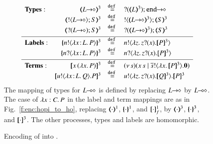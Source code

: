 \begin{figure}[t]
\[
\begin{array}{lrcll}
\noindent{\bf Types:} & 
		\tmap{\shot{L}}{3} &\defeq& \shot{\btinp{\tmap{L}{3}} \tinact}
		\\
&		\tmap{\btout{\shot{L}} S}{3} &\defeq& \btout{\tmap{\shot{L}}{3}} \tmap{S}{3}
		\\
&		\tmap{\btinp{\shot{L}} S}{3} &\defeq& \btinp{\tmap{\shot{L}}{3}} \tmap{S}{3}
\\[1mm]
\hline
\noindent{\bf Labels:} & 
		\mapa{\bactout{n}{\abs{\AT{x}{L}}{P}}}^{3} &\defeq& \bactout{n}{\abs{z}{\binp{z}{x} \pmap{P}{3}}}
		\\
&		\mapa{\bactinp{n}{\abs{\AT{x}{L}}{P}}}^{3} &\defeq& \bactinp{n}{\abs{z}{\binp{z}{x} \pmap{P}{3}}}
\\[1mm]
\hline
{\bf Terms}: & 
	\pmap{\appl{x}{(\abs{x} P)}}{3} &\defeq& \newsp{s}{\appl{x}{s} \Par \bout{\dual{s}}{\abs{x} \pmap{P}{3}} \inact}
		\\
&	\pmap{\bout{u}{\abs{\AT{x}{L}}{Q}} P}{3} &\defeq& \bout{u}{\abs{z}{\binp{z}{x} \pmap{Q}{3}}} \pmap{P}{3}
	\end{array}
	\]
The mapping of types for $L\!\! \multimap\!\! \diamond$ is defined by replacing 
$L\!\! \rightarrow\!\! \diamond$ by $L\!\! \multimap\!\! \diamond$. 
The case of $\lambda x:C.\,P$ in the label and term mappings 
are %
as in Fig.~\ref{f:enc:hopi_to_ho}, replacing 
$(\!\!\langle\cdot\rangle\!\!)^{1}$,
$\{\!\!\{\cdot\}\!\!\}^{1}$, and 
$[\!\![\cdot]\!\!]^1_f$, by  
$(\!\!\langle\cdot\rangle\!\!)^{3}$,
$\{\!\!\{\cdot\}\!\!\}^{3}$, and 
$[\!\![\cdot]\!\!]^3$. 
The other processes, types and labels are  homomorphic. 
\caption{\label{f:enc:hopip_to_hopi} 
Encoding of \HOpp into \HOp.
}
\Hline
\end{figure} 

